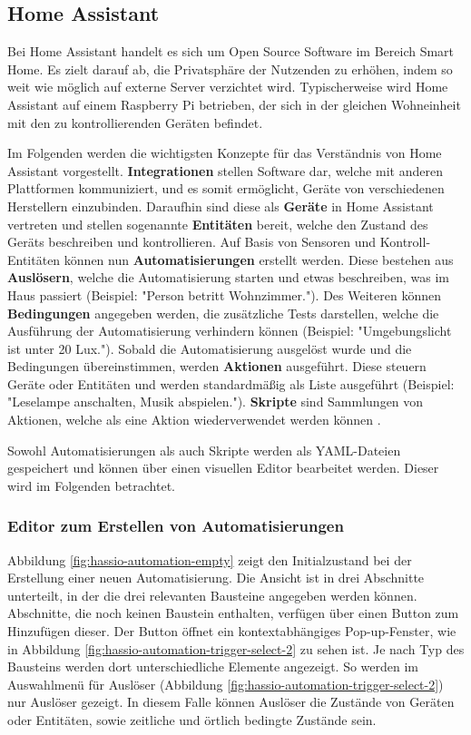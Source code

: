 \newcommand{\hascwidth}{.49\textwidth}
\subsection{Home Assistant}
\label{sec:home-assistant}

Bei Home Assistant handelt es sich um Open Source Software im Bereich Smart Home. Es zielt darauf ab, die Privatsphäre der Nutzenden zu erhöhen, indem so weit wie möglich auf externe Server verzichtet wird\parencite{openhomefoundationHomeAssistant}. Typischerweise wird Home Assistant auf einem Raspberry Pi betrieben, der sich in der gleichen Wohneinheit mit den zu kontrollierenden Geräten befindet.

Im Folgenden werden die wichtigsten Konzepte für das Verständnis von Home Assistant vorgestellt. \textbf{Integrationen} stellen Software dar, welche mit anderen Plattformen kommuniziert, und es somit ermöglicht, Geräte von verschiedenen Herstellern einzubinden. Daraufhin sind diese als \textbf{Geräte} in Home Assistant vertreten und stellen sogenannte \textbf{Entitäten} bereit, welche den Zustand des Geräts beschreiben und kontrollieren. Auf Basis von Sensoren und Kontroll-Entitäten können nun \textbf{Automatisierungen} erstellt werden. Diese bestehen aus \textbf{Auslösern}, welche die Automatisierung starten und etwas beschreiben, was im Haus passiert (Beispiel: "Person betritt Wohnzimmer."). Des Weiteren können \textbf{Bedingungen} angegeben werden, die zusätzliche Tests darstellen, welche die Ausführung der Automatisierung verhindern können (Beispiel: "Umgebungslicht ist unter 20 Lux."). Sobald die Automatisierung ausgelöst wurde und die Bedingungen übereinstimmen, werden \textbf{Aktionen} ausgeführt. Diese steuern Geräte oder Entitäten und werden standardmäßig als Liste ausgeführt (Beispiel: "Leselampe anschalten, Musik abspielen."). \textbf{Skripte} sind Sammlungen von Aktionen, welche als eine Aktion wiederverwendet werden können \parencite{openhomefoundationConceptsTerminology}.

Sowohl Automatisierungen als auch Skripte werden als \ac{YAML}-Dateien gespeichert und können über einen visuellen Editor bearbeitet werden. Dieser wird im Folgenden betrachtet.

\subsubsection{Editor zum Erstellen von Automatisierungen}
Abbildung \ref{fig:hassio-automation-empty} zeigt den Initialzustand bei der Erstellung einer neuen Automatisierung. Die Ansicht ist in drei Abschnitte unterteilt, in der die drei relevanten Bausteine angegeben werden können. Abschnitte, die noch keinen Baustein enthalten, verfügen über einen Button zum Hinzufügen dieser. Der Button öffnet ein kontextabhängiges Pop-up-Fenster, wie in Abbildung \ref{fig:hassio-automation-trigger-select-2} zu sehen ist. Je nach Typ des Bausteins werden dort unterschiedliche Elemente angezeigt. So werden im Auswahlmenü für Auslöser (Abbildung \ref{fig:hassio-automation-trigger-select-2}) nur Auslöser gezeigt. In diesem Falle können Auslöser die Zustände von Geräten oder Entitäten, sowie zeitliche und örtlich bedingte Zustände sein.


